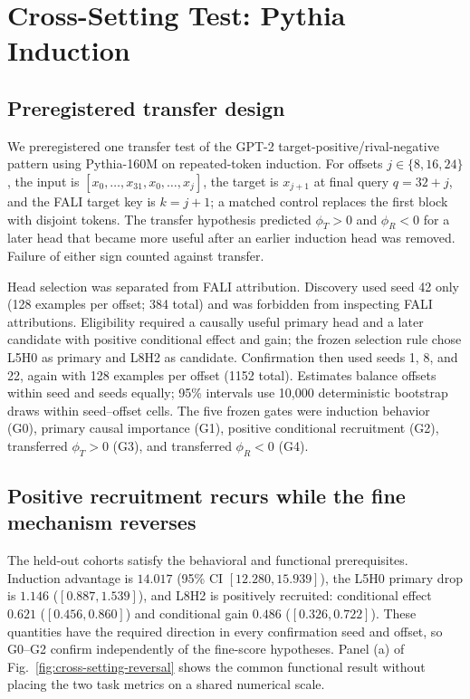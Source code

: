 \section{Cross-Setting Test: Pythia Induction}\label{sec:pythia}

\subsection{Preregistered transfer design}\label{sec:pythia-design}

We preregistered one transfer test of the GPT-2 target-positive/rival-negative pattern using Pythia-160M on repeated-token induction. For offsets $j\in\{8,16,24\}$, the input is $[x_0,\ldots,x_{31},x_0,\ldots,x_j]$, the target is $x_{j+1}$ at final query $q=32+j$, and the FALI target key is $k=j+1$; a matched control replaces the first block with disjoint tokens. The transfer hypothesis predicted $\phi_T>0$ and $\phi_R<0$ for a later head that became more useful after an earlier induction head was removed. Failure of either sign counted against transfer.

Head selection was separated from FALI attribution. Discovery used seed 42 only (128 examples per offset; 384 total) and was forbidden from inspecting FALI attributions. Eligibility required a causally useful primary head and a later candidate with positive conditional effect and gain; the frozen selection rule chose L5H0 as primary and L8H2 as candidate. Confirmation then used seeds 1, 8, and 22, again with 128 examples per offset (1152 total). Estimates balance offsets within seed and seeds equally; 95\% intervals use 10,000 deterministic bootstrap draws within seed--offset cells. The five frozen gates were induction behavior (G0), primary causal importance (G1), positive conditional recruitment (G2), transferred $\phi_T>0$ (G3), and transferred $\phi_R<0$ (G4).

\subsection{Positive recruitment recurs while the fine mechanism reverses}\label{sec:pythia-results}

The held-out cohorts satisfy the behavioral and functional prerequisites. Induction advantage is $14.017$ (95\% CI $[12.280,15.939]$), the L5H0 primary drop is $1.146$ ($[0.887,1.539]$), and L8H2 is positively recruited: conditional effect $0.621$ ($[0.456,0.860]$) and conditional gain $0.486$ ($[0.326,0.722]$). These quantities have the required direction in every confirmation seed and offset, so G0--G2 confirm independently of the fine-score hypotheses. Panel (a) of Fig.~\ref{fig:cross-setting-reversal} shows the common functional result without placing the two task metrics on a shared numerical scale.

